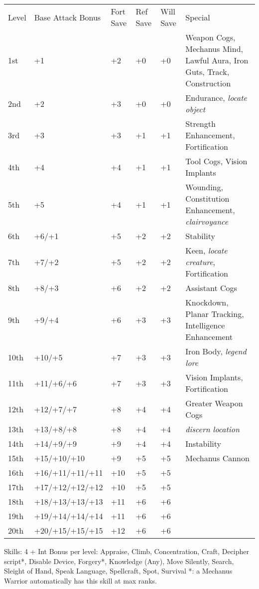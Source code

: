  \label{class:mechanuswarrior}
\vspace*{-8pt}


\begin{table}[tbh]
\begin{small}
\begin{tabular}{lp{3cm}p{0.7cm}p{0.7cm}p{0.7cm}l}
Level  &Base Attack Bonus &Fort Save &Ref Save &Will Save &Special\\
1st &+1 &+2 &+0 &+0 &Weapon Cogs, Mechanus Mind, Lawful Aura, Iron Guts, Track, Construction\\
2nd &+2 &+3 &+0 &+0 &Endurance, \textit{locate object} \\
3rd &+3 &+3 &+1 &+1 &Strength Enhancement, Fortification \\
4th &+4 &+4 &+1 &+1 &Tool Cogs, Vision Implants \\
5th &+5 &+4 &+1 &+1 &Wounding, Constitution Enhancement, \textit{clairvoyance}\\
6th &+6/+1 &+5 &+2 &+2 &Stability\\
7th &+7/+2 &+5 &+2 &+2 &Keen, \textit{locate creature}, Fortification\\
8th &+8/+3 &+6 &+2 &+2 &Assistant Cogs\\
9th &+9/+4 &+6 &+3 &+3 &Knockdown, Planar Tracking, Intelligence Enhancement\\
10th &+10/+5 &+7 &+3 &+3 &Iron Body, \textit{legend lore}\\
11th &+11/+6/+6 &+7 &+3 &+3 &Vision Implants, Fortification\\
12th &+12/+7/+7 &+8 &+4 &+4 &Greater Weapon Cogs\\
13th &+13/+8/+8 &+8 &+4 &+4 &\textit{discern location}\\
14th &+14/+9/+9 &+9 &+4 &+4 &Instability\\
15th &+15/+10/+10 &+9 &+5 &+5 &Mechanus Cannon\\
16th &+16/+11/+11/+11 &+10 &+5 &+5 &\\
17th &+17/+12/+12/+12 &+10 &+5 &+5 &\\
18th &+18/+13/+13/+13 &+11 &+6 &+6 &\\
19th &+19/+14/+14/+14 &+11 &+6 &+6 &\\
20th &+20/+15/+15/+15 &+12 &+6 &+6 &\\
\end{tabular}
\end{small}
\end{table}

Skills: 4 + Int Bonus per level: Appraise, Climb, Concentration, Craft, Decipher script*, Disable Device, Forgery*, Knowledge (Any), Move Silently, Search, Sleight of Hand, Speak Language, Spellcraft, Spot, Survival
    *: a Mechanus Warrior automatically has this skill at max ranks.



